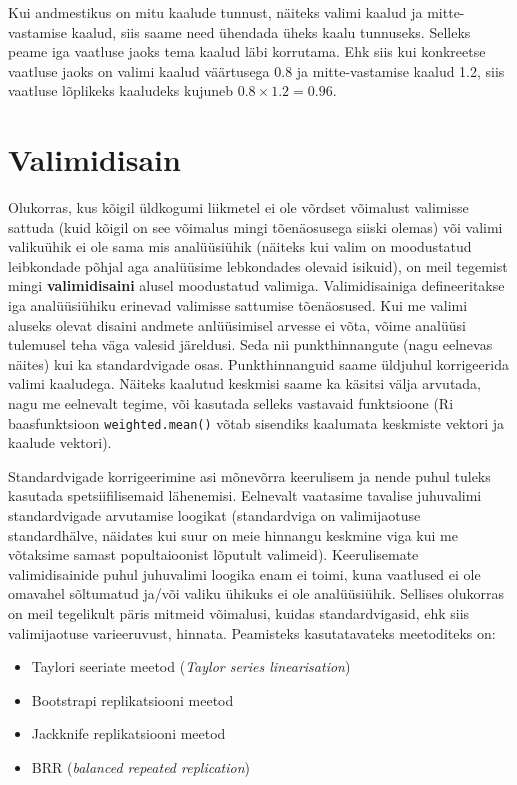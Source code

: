 \documentclass[
]{book}
\providecommand{\tightlist}{%
  \setlength{\itemsep}{0pt}\setlength{\parskip}{0pt}}
\begin{document}
Kui andmestikus on mitu kaalude tunnust, näiteks valimi kaalud ja mitte-vastamise kaalud, siis saame need ühendada üheks kaalu tunnuseks. Selleks peame iga vaatluse jaoks tema kaalud läbi korrutama. Ehk siis kui konkreetse vaatluse jaoks on valimi kaalud väärtusega 0.8 ja mitte-vastamise kaalud 1.2, siis vaatluse lõplikeks kaaludeks kujuneb \(0.8 \times1.2 = 0.96\).

\hypertarget{valimidisain}{%
\section{Valimidisain}\label{valimidisain}}

Olukorras, kus kõigil üldkogumi liikmetel ei ole võrdset võimalust valimisse sattuda (kuid kõigil on see võimalus mingi tõenäosusega siiski olemas) või valimi valikuühik ei ole sama mis analüüsiühik (näiteks kui valim on moodustatud leibkondade põhjal aga analüüsime lebkondades olevaid isikuid), on meil tegemist mingi \textbf{valimidisaini} alusel moodustatud valimiga. Valimidisainiga defineeritakse iga analüüsiühiku erinevad valimisse sattumise tõenäosused. Kui me valimi aluseks olevat disaini andmete anlüüsimisel arvesse ei võta, võime analüüsi tulemusel teha väga valesid järeldusi. Seda nii punkthinnangute (nagu eelnevas näites) kui ka standardvigade osas. Punkthinnanguid saame üldjuhul korrigeerida valimi kaaludega. Näiteks kaalutud keskmisi saame ka käsitsi välja arvutada, nagu me eelnevalt tegime, või kasutada selleks vastavaid funktsioone (Ri baasfunktsioon \texttt{weighted.mean()} võtab sisendiks kaalumata keskmiste vektori ja kaalude vektori).

Standardvigade korrigeerimine asi mõnevõrra keerulisem ja nende puhul tuleks kasutada spetsiifilisemaid lähenemisi. Eelnevalt vaatasime tavalise juhuvalimi standardvigade arvutamise loogikat (standardviga on valimijaotuse standardhälve, näidates kui suur on meie hinnangu keskmine viga kui me võtaksime samast popultaioonist lõputult valimeid). Keerulisemate valimidisainide puhul juhuvalimi loogika enam ei toimi, kuna vaatlused ei ole omavahel sõltumatud ja/või valiku ühikuks ei ole analüüsiühik. Sellises olukorras on meil tegelikult päris mitmeid võimalusi, kuidas standardvigasid, ehk siis valimijaotuse varieeruvust, hinnata. Peamisteks kasutatavateks meetoditeks on:

\begin{itemize}
\tightlist
\item
  Taylori seeriate meetod (\emph{Taylor series linearisation})
\item
  Bootstrapi replikatsiooni meetod
\item
  Jackknife replikatsiooni meetod
\item
  BRR (\emph{balanced repeated replication})
\end{itemize}
\end{document}
